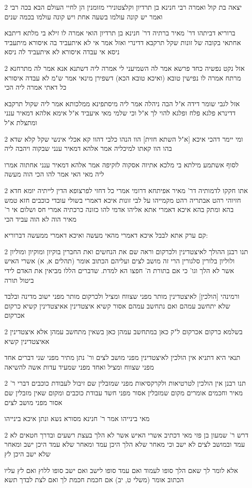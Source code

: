 \documentclass[12pt, openany]{book}
\newcommand{\sethebfont}{
\fontsize{10.5pt}{21.0pt} \selectfont
}
\newcommand{\twocol}[1]{
	{\sethebfont \begin{multicols}{2}
			#1
	\end{multicols}}	
}
\begin{document}
\twocol{יצאה בת קול ואמרה רבי חנינא בן תרדיון וקלצטונירי מזומנין הן לחיי העולם הבא בכה רבי ואמר יש קונה עולמו בשעה אחת ויש קונה עולמו בכמה שנים
\par ברוריא דביתהו דר' מאיר ברתיה דר' חנינא בן תרדיון הואי אמרה לו זילא בי מלתא דיתבא אחתאי בקובה של זונות שקל תרקבא דדינרי ואזל אמר אי לא איתעביד בה איסורא מיתעביד ניסא אי עבדה איסורא לא איתעביד לה ניסא}
\twocol{אזל נקט נפשיה כחד פרשא אמר לה השמיעני לי אמרה ליה דשתנא אנא אמר לה מתרחנא מרתח אמרה לו נפישין טובא (ואיכא טובא הכא) דשפירן מינאי אמר ש"מ לא עבדה איסורא כל דאתי אמרה ליה הכי
\par אזל לגבי שומר דידה א"ל הבה ניהלה אמר ליה מיסתפינא ממלכותא אמר ליה שקול תרקבא דדינרא פלגא פלח ופלגא להוי לך א"ל וכי שלמי מאי איעביד א"ל אימא אלהא דמאיר ענני ומתצלת א"ל}
\twocol{ומי יימר דהכי איכא [א"ל השתא חזית] הוו הנהו כלבי דהוו קא אכלי אינשי שקל קלא שדא בהו הוו קאתו למיכליה אמר אלהא דמאיר ענני שבקוה ויהבה ליה
\par לסוף אשתמע מילתא בי מלכא אתיוה אסקוה לזקיפה אמר אלהא דמאיר ענני אחתוה אמרו ליה מאי האי אמר להו הכי הוה מעשה}
\twocol{אתו חקקו לדמותיה דר' מאיר אפיתחא דרומי אמרי כל דחזי לפרצופא הדין לייתיה יומא חדא חזיוהי רהט אבתריה רהט מקמייהו על לבי זונות איכא דאמרי בשולי עובדי כוכבים חזא טמש בהא ומתק בהא איכא דאמרי אתא אליהו אדמי להו כזונה כרכתיה אמרי חס ושלום אי ר' מאיר הוה לא הוה עביד הכי
\par קם ערק אתא לבבל איכא דאמרי מהאי מעשה ואיכא דאמרי ממעשה דברוריא:}
\twocol{תנו רבנן ההולך לאיצטדינין ולכרקום וראה שם את הנחשים ואת החברין בוקיון ומוקיון ומוליון ולוליון בלורין סלגורין הרי זה מושב לצים ועליהם הכתוב אומר (תהלים א, א) אשרי האיש אשר לא הלך וגו' כי אם בתורת ה' חפצו הא למדת. שדברים הללו מביאין את האדם לידי ביטול תורה
\par ורמינהי [הולכין] לאיצטדינין מותר מפני שצווח ומציל ולכרקום מותר מפני ישוב מדינה ובלבד שלא יתחשב עמהם ואם נתחשב עמהם אסור קשיא איצטדינין אאיצטדינין קשיא כרקום אכרקום}
\twocol{בשלמא כרקום אכרקום ל"ק כאן במתחשב עמהן כאן בשאין מתחשב עמהן אלא איצטדינין אאיצטדינין קשיא
\par תנאי היא דתניא אין הולכין לאיצטדינין מפני מושב לצים ור' נתן מתיר מפני שני דברים אחד מפני שצווח ומציל ואחד מפני שמעיד עדות אשה להשיאה}
\twocol{תנו רבנן אין הולכין לטרטיאות ולקרקסיאות מפני שמזבלין שם זיבול לעבודת כוכבים דברי ר' מאיר וחכמים אומרים מקום שמזבלין אסור מפני חשד עבודת כוכבים ומקום שאין מזבלין שם אסור מפני מושב לצים
\par מאי בינייהו אמר ר' חנינא מסורא נשא ונתן איכא בינייהו}
\twocol{דרש ר' שמעון בן פזי מאי דכתיב אשרי האיש אשר לא הלך בעצת רשעים ובדרך חטאים לא עמד ובמושב לצים לא ישב וכי מאחר שלא הלך היכן עמד ומאחר שלא עמד היכן ישב ומאחר שלא ישב היכן לץ
\par אלא לומר לך שאם הלך סופו לעמוד ואם עמד סופו לישב ואם ישב סופו ללוץ ואם לץ עליו הכתוב אומר (משלי ט, יב) אם חכמת חכמת לך ואם לצת לבדך תשא}
\end{document}
